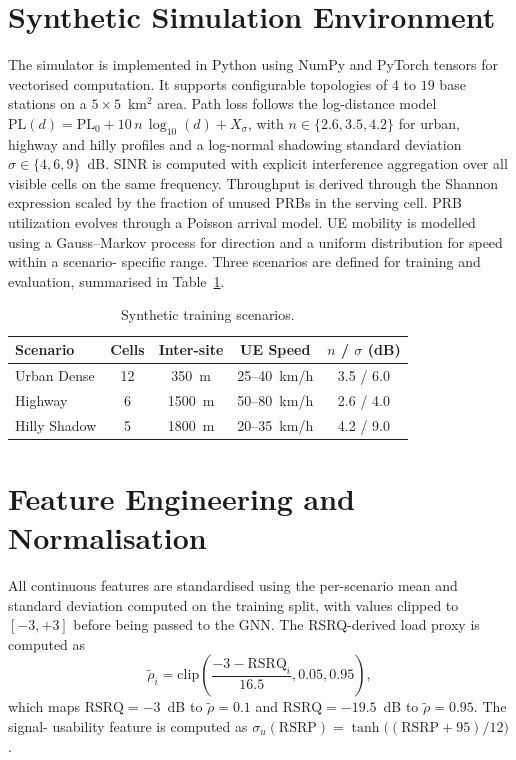 \documentclass[12pt,a4paper,oneside]{report}
\begin{document}
\section{Synthetic Simulation Environment}

The simulator is implemented in Python using NumPy and PyTorch tensors
for vectorised computation. It supports configurable topologies of
$4$ to $19$ base stations on a $5 \times 5$~km$^2$ area. Path loss
follows the log-distance model
$\mathrm{PL}(d) = \mathrm{PL}_0 + 10\,n\,\log_{10}(d) + X_\sigma$, with
$n \in \{2.6, 3.5, 4.2\}$ for urban, highway and hilly profiles and a
log-normal shadowing standard deviation
$\sigma \in \{4, 6, 9\}$~dB. SINR is computed with explicit interference
aggregation over all visible cells on the same frequency. Throughput is
derived through the Shannon expression scaled by the fraction of unused
PRBs in the serving cell. PRB utilization evolves through a Poisson
arrival model. UE mobility is modelled using a Gauss--Markov process
for direction and a uniform distribution for speed within a scenario-
specific range. Three scenarios are defined for training and
evaluation, summarised in Table~\ref{tab:scenarios}.

\begin{table}[H]
    \centering
    \caption{Synthetic training scenarios.}
    \label{tab:scenarios}
    \small
    \begin{tabularx}{\textwidth}{lcccc}
        \toprule
        \textbf{Scenario} & \textbf{Cells} & \textbf{Inter-site} &
        \textbf{UE Speed} & \textbf{$n$ / $\sigma$ (dB)} \\
        \midrule
        Urban Dense  & 12 & 350~m  & 25--40~km/h & 3.5 / 6.0\\
        Highway      &  6 & 1500~m & 50--80~km/h & 2.6 / 4.0\\
        Hilly Shadow &  5 & 1800~m & 20--35~km/h & 4.2 / 9.0\\
        \bottomrule
    \end{tabularx}
\end{table}

\section{Feature Engineering and Normalisation}

All continuous features are standardised using the per-scenario mean
and standard deviation computed on the training split, with values
clipped to $[-3, +3]$ before being passed to the GNN. The RSRQ-derived
load proxy is computed as
\begin{equation}
    \tilde{\rho}_i = \mathrm{clip}\!\left(
    \frac{-3 - \mathrm{RSRQ}_i}{16.5}, 0.05, 0.95\right),
\end{equation}
which maps $\mathrm{RSRQ} = -3$~dB to $\tilde{\rho} = 0.1$ and
$\mathrm{RSRQ} = -19.5$~dB to $\tilde{\rho} = 0.95$. The signal-
usability feature is computed as
$\sigma_u(\mathrm{RSRP}) = \tanh\!\big((\mathrm{RSRP}+95)/12\big)$.
\end{document}
